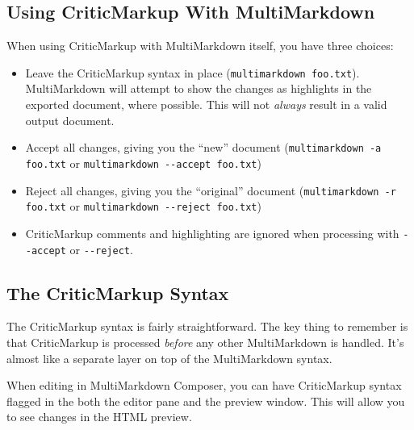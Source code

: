 \subsection{Using CriticMarkup With MultiMarkdown}
\label{usingcriticmarkupwithmultimarkdown}

When using CriticMarkup with MultiMarkdown itself, you have three choices:

\begin{itemize}
\item Leave the CriticMarkup syntax in place (\texttt{multimarkdown foo.txt}). MultiMarkdown will attempt to show the changes as highlights in the exported document, where possible. This will not \emph{always} result in a valid output document.

\item Accept all changes, giving you the ``new'' document (\texttt{multimarkdown -a foo.txt} or \texttt{multimarkdown -{}-accept foo.txt})

\item Reject all changes, giving you the ``original'' document (\texttt{multimarkdown -r foo.txt} or \texttt{multimarkdown -{}-reject foo.txt})

\item CriticMarkup comments and highlighting are ignored when processing with \texttt{-{}-accept} or \texttt{-{}-reject}.

\end{itemize}

\subsection{The CriticMarkup Syntax}
\label{thecriticmarkupsyntax}

The CriticMarkup syntax is fairly straightforward. The key thing to remember is that CriticMarkup is processed \emph{before} any other MultiMarkdown is handled. It's almost like a separate layer on top of the MultiMarkdown syntax.

When editing in MultiMarkdown Composer, you can have CriticMarkup syntax flagged in the both the editor pane and the preview window. This will allow you to see changes in the HTML preview.

